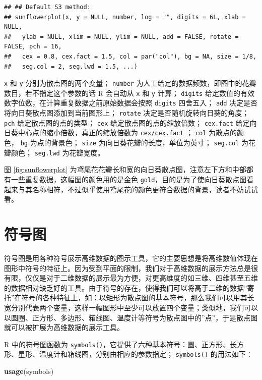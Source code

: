 \documentclass[
  b5paper,
  UTF8,twoside]{book}
\newenvironment{Shaded}{\begin{snugshade}}{\end{snugshade}}
\newcommand{\FunctionTok}[1]{\textcolor[rgb]{0.13,0.29,0.53}{\textbf{#1}}}
\newcommand{\NormalTok}[1]{#1}
\begin{document}
\begin{verbatim}
## ## Default S3 method:
## sunflowerplot(x, y = NULL, number, log = "", digits = 6L, xlab = NULL,
##   ylab = NULL, xlim = NULL, ylim = NULL, add = FALSE, rotate = FALSE, pch = 16,
##   cex = 0.8, cex.fact = 1.5, col = par("col"), bg = NA, size = 1/8,
##   seg.col = 2, seg.lwd = 1.5, ...)
\end{verbatim}

\texttt{x} 和 \texttt{y} 分别为散点图的两个变量； \texttt{number} 为人工给定的数据频数，即图中的花瓣数目，若不指定这个参数的话 R 会自动从 \texttt{x} 和 \texttt{y} 计算； \texttt{digits} 给定数值的有效数字位数，在计算重复数据之前原始数据会按照 \texttt{digits} 四舍五入； \texttt{add} 决定是否将向日葵散点图添加到当前图形上； \texttt{rotate} 决定是否随机旋转向日葵的角度； \texttt{pch} 给定散点图的点的类型； \texttt{cex} 给定散点图的点的缩放倍数； \texttt{cex.fact} 给定向日葵中心点的缩小倍数，真正的缩放倍数为 \texttt{cex/cex.fact} ； \texttt{col} 为散点的颜色， \texttt{bg} 为点的背景色； \texttt{size} 为向日葵花瓣的长度，单位为英寸； \texttt{seg.col} 为花瓣颜色； \texttt{seg.lwd} 为花瓣宽度。

图 \ref{fig:sunflowerplot} 为鸢尾花花瓣长和宽的向日葵散点图，注意左下方和中部都有一些重复数据，这幅图的颜色用的是金色 \texttt{\textquotesingle{}gold\textquotesingle{}}，目的是为了使向日葵散点图看起来与其名称相符，不过似乎使用鸢尾花的颜色更符合数据的背景，读者不妨试试看。

\section{符号图}\label{sec:symbols}

符号图是用各种符号展示高维数据的图示工具，它的主要思想是将高维数值体现在图形中符号的特征上。因为受到平面的限制，我们对于高维数据的展示方法总是很有限，仅仅是对于二维数据的展示最为方便，对更高维度的如三维、四维甚至五维的数据相对缺乏好的工具。由于符号的存在，使得我们可以将高于二维的数据''寄托''在符号的各种特征上，如：以矩形为散点图的基本符号，那么我们可以用其长宽分别代表两个变量，这样一幅图形中至少可以放置四个变量；类似地，我们可以以圆圈、正方形、多边形、箱线图、温度计等符号为散点图中的''点''，于是散点图就可以被扩展为高维数据的展示工具。

R 中的符号图函数为 \texttt{symbols()}，它提供了六种基本符号：圆、正方形、长方形、星形、温度计和箱线图，分别由相应的参数指定； \texttt{symbols()} 的用法如下：

\begin{Shaded}
\begin{Highlighting}[]
\FunctionTok{usage}\NormalTok{(symbols)}
\end{Highlighting}
\end{Shaded}
\end{document}
